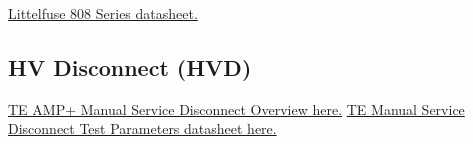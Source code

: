 \documentclass{article}
\begin{document}
\href{http://www.littelfuse.com/~/media/c635bf51279f4ef6bedee5deb356e102.ashx}{Littelfuse 808 Series datasheet.}

\subsection{HV Disconnect (HVD)}\label{appendix_hvd}
\href{http://www.te.com/content/dam/te-com/documents/hybrid-and-electric-mobility-solutions/global/8-1773462-2-msd.pdf}{TE AMP+ Manual Service Disconnect Overview here.}
\href{http://www.te.com/commerce/DocumentDelivery/DDEController?Action=showdoc&DocId=Specification+Or+Standard%7F108-127000%7FA%7Fpdf%7FEnglish%7FENG_SS_108-127000_A.pdf%7FN-A}{TE Manual Service Disconnect Test Parameters datasheet here.}
\end{document}

